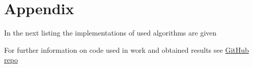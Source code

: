 \section*{Appendix}

In the next listing the implementations of used algorithms are given



For further information on code used in work and obtained results see \href{https://github.com/RyazMax/ITMO_Algorithms/tree/main/LR6}{GitHub repo}